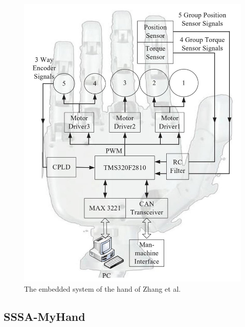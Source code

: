 \documentclass[a4paper, 10pt, conference]{ieeeconf}      %
\begin{document}
\begin{figure}[h]

	\centering
	\includegraphics[scale=0.7]{images/Zhang3}
	
	\caption{The embedded system of the hand of Zhang et al.}
	\label{fig:embzhang}
\end{figure}

\subsection{SSSA-MyHand}
\end{document}
